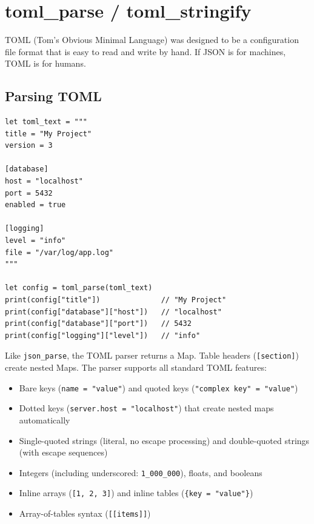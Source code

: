 \section{toml\_parse / toml\_stringify}\label{sec:toml}


TOML (Tom's Obvious Minimal Language) was designed to be a configuration file
format that is easy to read and write by hand. If JSON is for machines, TOML
is for humans.

\subsection{Parsing TOML}

\begin{lstlisting}[language=Lattice, caption={Parsing a TOML configuration}]
let toml_text = """
title = "My Project"
version = 3

[database]
host = "localhost"
port = 5432
enabled = true

[logging]
level = "info"
file = "/var/log/app.log"
"""

let config = toml_parse(toml_text)
print(config["title"])              // "My Project"
print(config["database"]["host"])   // "localhost"
print(config["database"]["port"])   // 5432
print(config["logging"]["level"])   // "info"
\end{lstlisting}

Like \lstinline|json_parse|, the TOML parser returns a Map. Table headers
(\texttt{[section]}) create nested Maps. The parser supports all standard
TOML features:

\begin{itemize}
    \item Bare keys (\texttt{name = "value"}) and quoted keys
          (\texttt{"complex key" = "value"})
    \item Dotted keys (\texttt{server.host = "localhost"}) that create
          nested maps automatically
    \item Single-quoted strings (literal, no escape processing) and
          double-quoted strings (with escape sequences)
    \item Integers (including underscored: \texttt{1\_000\_000}),
          floats, and booleans
    \item Inline arrays (\texttt{[1, 2, 3]}) and inline tables
          (\texttt{\{key = "value"\}})
    \item Array-of-tables syntax (\texttt{[[items]]})
\end{itemize}

